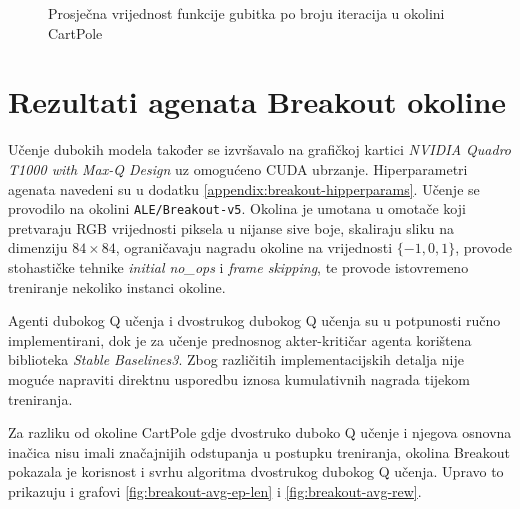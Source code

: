 \begin{figure}[H]
    \centering
    \caption{Prosječna vrijednost funkcije gubitka po broju iteracija u okolini CartPole}
    \label{fig:cartpole-loss}
\end{figure}

\section{Rezultati agenata Breakout okoline}

Učenje dubokih modela također se izvršavalo na grafičkoj kartici \textit{NVIDIA Quadro T1000 with Max-Q Design} uz omogućeno CUDA ubrzanje. Hiperparametri agenata navedeni su u dodatku \ref{appendix:breakout-hipperparams}. Učenje se provodilo na okolini \texttt{ALE/Breakout-v5}. Okolina je umotana u omotače koji pretvaraju RGB vrijednosti piksela u nijanse sive boje, skaliraju sliku na dimenziju $84 \times 84$, ograničavaju nagradu okoline na vrijednosti $\{-1, 0, 1\}$, provode stohastičke tehnike \textit{initial no_ops} i \textit{frame skipping}, te provode istovremeno treniranje nekoliko instanci okoline.

Agenti dubokog Q učenja i dvostrukog dubokog Q učenja su u potpunosti ručno implementirani, dok je za učenje prednosnog akter-kritičar agenta korištena biblioteka \textit{Stable Baselines3}. Zbog različitih implementacijskih detalja nije moguće napraviti direktnu usporedbu iznosa kumulativnih nagrada tijekom treniranja. 

Za razliku od okoline CartPole gdje dvostruko duboko Q učenje i njegova osnovna inačica nisu imali značajnijih odstupanja u postupku treniranja, okolina Breakout pokazala je korisnost i svrhu algoritma dvostrukog dubokog Q učenja. Upravo to prikazuju i grafovi \ref{fig:breakout-avg-ep-len} i \ref{fig:breakout-avg-rew}.

